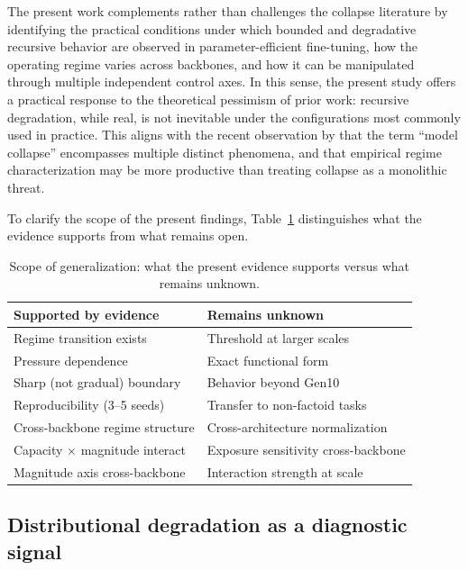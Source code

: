 \documentclass[a4paper,fleqn]{cas-dc}
\renewcommand{\arraystretch}{1.8}
\begin{document}
The present work complements rather than challenges the collapse literature by
identifying the practical conditions under which bounded and degradative
recursive behavior are observed in parameter-efficient fine-tuning, how the
operating regime varies across backbones, and how it can be manipulated through
multiple independent control axes. In this sense, the present study offers a
practical response to the theoretical pessimism of prior work: recursive
degradation, while real, is not inevitable under the configurations most
commonly used in practice. This aligns with the recent observation by
\citet{schaeffer2025position} that the term ``model collapse'' encompasses
multiple distinct phenomena, and that empirical regime characterization may be
more productive than treating collapse as a monolithic threat.

To clarify the scope of the present findings, Table~\ref{tab:generalization}
distinguishes what the evidence supports from what remains open.

\begin{table}[htbp]
\caption{Scope of generalization: what the present evidence supports versus
what remains unknown.}\label{tab:generalization}
\footnotesize
\renewcommand{\arraystretch}{1.4}
\begin{tabular}{@{}p{3.6cm}p{3.6cm}@{}}
\toprule
\textbf{Supported by evidence} & \textbf{Remains unknown} \\
\midrule
Regime transition exists & Threshold at larger scales \\
\addlinespace
Pressure dependence & Exact functional form \\
\addlinespace
Sharp (not gradual) boundary & Behavior beyond Gen10 \\
\addlinespace
Reproducibility (3--5 seeds) & Transfer to non-factoid tasks \\
\addlinespace
Cross-backbone regime structure & Cross-architecture normalization \\
\addlinespace
Capacity $\times$ magnitude interact & Exposure sensitivity cross-backbone \\
\addlinespace
Magnitude axis cross-backbone & Interaction strength at scale \\
\bottomrule
\end{tabular}
\end{table}

\subsection{Distributional degradation as a diagnostic signal}\label{sec:disc_drift}
\end{document}
